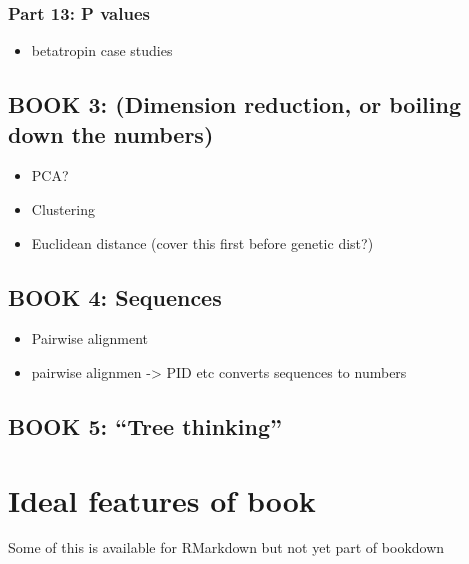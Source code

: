 \documentclass[
]{book}
\providecommand{\tightlist}{%
  \setlength{\itemsep}{0pt}\setlength{\parskip}{0pt}}
\begin{document}
\hypertarget{part-13-p-values}{%
\subsubsection{Part 13: P values}\label{part-13-p-values}}

\begin{itemize}
\tightlist
\item
  betatropin case studies
\end{itemize}

\hypertarget{book-3-dimension-reduction-or-boiling-down-the-numbers}{%
\subsection{BOOK 3: (Dimension reduction, or boiling down the numbers)}\label{book-3-dimension-reduction-or-boiling-down-the-numbers}}

\begin{itemize}
\tightlist
\item
  PCA?
\item
  Clustering
\item
  Euclidean distance (cover this first before genetic dist?)
\end{itemize}

\hypertarget{book-4-sequences}{%
\subsection{BOOK 4: Sequences}\label{book-4-sequences}}

\begin{itemize}
\tightlist
\item
  Pairwise alignment
\item
  pairwise alignmen -\textgreater{} PID etc converts sequences to numbers
\end{itemize}

\hypertarget{book-5-tree-thinking}{%
\subsection{BOOK 5: ``Tree thinking''}\label{book-5-tree-thinking}}

\hypertarget{ideal-features-of-book}{%
\section{Ideal features of book}\label{ideal-features-of-book}}

Some of this is available for RMarkdown but not yet part of bookdown
\end{document}
